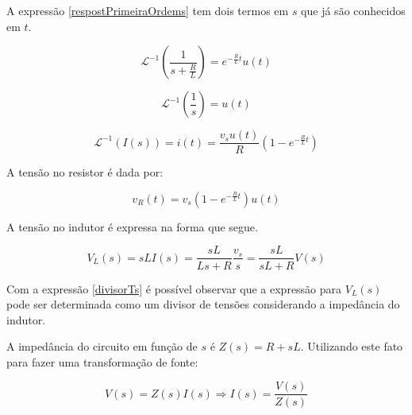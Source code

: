 \documentclass[12pt,fleqn]{book} %
\begin{document}
    A expressão \ref{respostPrimeiraOrdems} tem dois termos em $s$ que já são conhecidos em $t$.
    
    \begin{equation}
    \mathscr{L}^{-1}(\frac{1}{s+\frac{R}{L}}) = e^{-\frac{R}{L}t}u(t)
    \end{equation}
    
    \begin{equation}
    \mathscr{L}^{-1}(\frac{1}{s}) = u(t)
    \end{equation}
    
    \begin{equation}
    \mathscr{L}^{-1}(I(s)) = i(t) = \frac{v_su(t)}{R}(1-e^{-\frac{R}{L}t})
    \end{equation}
    
    A tensão no resistor é dada por:
    
    \begin{equation}
    v_R(t) = v_s(1-e^{-\frac{R}{L}t})u(t)
    \end{equation}
    
    A tensão no indutor é expressa na forma que segue.
    
    \begin{equation}\label{divisorTs}
    V_L(s) = sLI(s) = \frac{sL}{Ls+R}\frac{v_s}{s} = \frac{sL}{sL+R}V(s)
    \end{equation}
    
    Com a expressão \ref{divisorTs} é possível observar que a expressão para $V_L(s)$ pode ser determinada como um divisor de tensões considerando a impedância do indutor.
    
    A impedância do circuito em função de $s$ é $Z(s) = R+sL$. Utilizando este fato para fazer uma transformação de fonte:
    
    \begin{equation}
    V(s) = Z(s)I(s)\Rightarrow I(s) = \frac{V(s)}{Z(s)}
    \end{equation}
    
\end{document}
